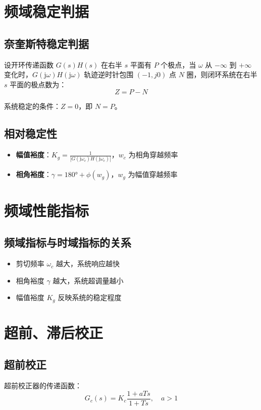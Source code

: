 \documentclass[12pt,a4paper]{article}
\newcommand{\jw}{\mathrm{j}\omega}
\begin{document}
\section{频域稳定判据}

\subsection{奈奎斯特稳定判据}
设开环传递函数 $G(s)H(s)$ 在右半 $s$ 平面有 $P$ 个极点，当 $\omega$ 从 $-\infty$ 到 $+\infty$ 变化时，$G(\jw)H(\jw)$ 轨迹逆时针包围 $(-1, j0)$ 点 $N$ 圈，则闭环系统在右半 $s$ 平面的极点数为：
\[Z = P - N\]

系统稳定的条件：$Z = 0$，即 $N = P$。

\subsection{相对稳定性}
\begin{itemize}
    \item \textbf{幅值裕度}：$K_g = \frac{1}{|G(\jw_c)H(\jw_c)|}$，$w_c$ 为相角穿越频率
    \item \textbf{相角裕度}：$\gamma = 180° + \phi(w_g)$，$w_g$ 为幅值穿越频率
\end{itemize}

\section{频域性能指标}

\subsection{频域指标与时域指标的关系}
\begin{itemize}
    \item 剪切频率 $\omega_c$ 越大，系统响应越快
    \item 相角裕度 $\gamma$ 越大，系统超调量越小
    \item 幅值裕度 $K_g$ 反映系统的稳定程度
\end{itemize}

\section{超前、滞后校正}

\subsection{超前校正}
超前校正器的传递函数：
\[G_c(s) = K_c \frac{1 + aTs}{1 + Ts}, \quad a > 1\]
\end{document}
